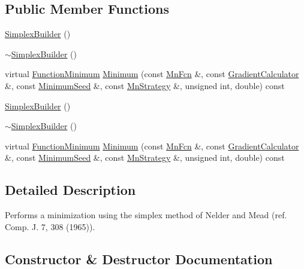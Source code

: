 \subsection*{Public Member Functions}
\begin{DoxyCompactItemize}
\item 
\mbox{\hyperlink{classROOT_1_1Minuit2_1_1SimplexBuilder_a2fdf7201f34b894f5f237e673c55492a}{Simplex\+Builder}} ()
\item 
\mbox{\hyperlink{classROOT_1_1Minuit2_1_1SimplexBuilder_a2559aceabff61d3361e5750aa6b97f73}{$\sim$\+Simplex\+Builder}} ()
\item 
virtual \mbox{\hyperlink{classROOT_1_1Minuit2_1_1FunctionMinimum}{Function\+Minimum}} \mbox{\hyperlink{classROOT_1_1Minuit2_1_1SimplexBuilder_a82c52765929e3f4a41b1abe1473d4140}{Minimum}} (const \mbox{\hyperlink{classROOT_1_1Minuit2_1_1MnFcn}{Mn\+Fcn}} \&, const \mbox{\hyperlink{classROOT_1_1Minuit2_1_1GradientCalculator}{Gradient\+Calculator}} \&, const \mbox{\hyperlink{classROOT_1_1Minuit2_1_1MinimumSeed}{Minimum\+Seed}} \&, const \mbox{\hyperlink{classROOT_1_1Minuit2_1_1MnStrategy}{Mn\+Strategy}} \&, unsigned int, double) const
\item 
\mbox{\hyperlink{classROOT_1_1Minuit2_1_1SimplexBuilder_a2fdf7201f34b894f5f237e673c55492a}{Simplex\+Builder}} ()
\item 
\mbox{\hyperlink{classROOT_1_1Minuit2_1_1SimplexBuilder_a2559aceabff61d3361e5750aa6b97f73}{$\sim$\+Simplex\+Builder}} ()
\item 
virtual \mbox{\hyperlink{classROOT_1_1Minuit2_1_1FunctionMinimum}{Function\+Minimum}} \mbox{\hyperlink{classROOT_1_1Minuit2_1_1SimplexBuilder_a68ea5d16ee89941e9674eb673dbde593}{Minimum}} (const \mbox{\hyperlink{classROOT_1_1Minuit2_1_1MnFcn}{Mn\+Fcn}} \&, const \mbox{\hyperlink{classROOT_1_1Minuit2_1_1GradientCalculator}{Gradient\+Calculator}} \&, const \mbox{\hyperlink{classROOT_1_1Minuit2_1_1MinimumSeed}{Minimum\+Seed}} \&, const \mbox{\hyperlink{classROOT_1_1Minuit2_1_1MnStrategy}{Mn\+Strategy}} \&, unsigned int, double) const
\end{DoxyCompactItemize}


\subsection{Detailed Description}
Performs a minimization using the simplex method of Nelder and Mead (ref. Comp. J. 7, 308 (1965)). 

\subsection{Constructor \& Destructor Documentation}
\mbox{\label{classROOT_1_1Minuit2_1_1SimplexBuilder_a2fdf7201f34b894f5f237e673c55492a}} 
